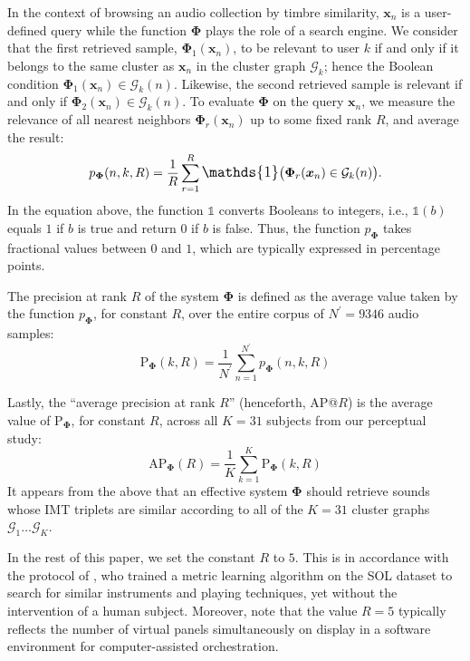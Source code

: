 \documentclass{bmcart}
\begin{document}
In the context of browsing an audio collection by timbre similarity, $\boldsymbol{x}_n$ is a user-defined query while the function $\mathbf{\Phi}$ plays the role of a search engine.
We consider that the first retrieved sample, $\mathbf{\Phi}_1 (\boldsymbol{x}_n)$, to be relevant to user $k$ if and only if it belongs to the same cluster as $\boldsymbol{x}_n$ in the cluster graph $\mathcal{G}_k$; hence the Boolean condition $\mathbf{\Phi}_{1}(\boldsymbol{x}_{n}) \in \mathcal{G}_k (n)$.
Likewise, the second retrieved sample is relevant if and only if $\mathbf{\Phi}_{2}(\boldsymbol{x}_{n}) \in \mathcal{G}_k (n)$.
To evaluate $\mathbf{\Phi}$ on the query $\boldsymbol{x}_n$, we measure the relevance of all nearest neighbors $\mathbf{\Phi}_r (\boldsymbol{x}_n)$ up to some fixed rank $R$, and average the result:
\begin{equation}
p_{\mathbf{\Phi}}(n, k, R) =
    \dfrac{1}{R}
    \sum_{r=1}^{R}
    \mathlarger{\mathds{1}}
    \big(
        \mathbf{\Phi}_r(\boldsymbol{x}_n)
        \in
        \mathcal{G}_k (n)
    \big).
\end{equation}
In the equation above, the function $\mathds{1}$ converts Booleans to integers, i.e., $\mathds{1}(b)$ equals $1$ if $b$ is true and return $0$ if $b$ is false.
Thus, the function $p_{\mathbf{\Phi}}$ takes fractional values between $0$ and $1$, which are typically expressed in percentage points.

The precision at rank $R$ of the system $\mathbf{\Phi}$ is defined as the average value taken by the function $p_{\mathbf{\Phi}}$, for constant $R$, over the entire corpus of $N^{\prime}=9346$ audio samples:
\begin{equation}
\mathrm{P}_{\mathbf{\Phi}}(k, R) =
\dfrac{1}{N^{\prime}}
\sum_{n=1}^{N^{\prime}}
p_{\mathbf{\Phi}}(n, k, R)
\end{equation}

Lastly, the ``average precision at rank $R$'' (henceforth, AP@$R$) is the average value of $\mathrm{P}_{\mathbf{\Phi}}$, for constant $R$, across all $K=31$ subjects from our perceptual study:
\begin{equation}
\mathrm{AP}_{\mathbf{\Phi}}(R) =
\dfrac{1}{K}
\sum_{k=1}^{K}
\mathrm{P}_{\mathbf{\Phi}}(k, R)
\end{equation}
It appears from the above that an effective system $\mathbf{\Phi}$ should retrieve sounds whose IMT triplets are similar according to all of the $K=31$ cluster graphs $\mathcal{G}_1 \ldots \mathcal{G}_K$.

In the rest of this paper, we set the constant $R$ to $5$.
This is in accordance with the protocol of \cite{lostanlen2018extended}, who trained a metric learning algorithm on the SOL dataset to search for similar instruments and playing techniques, yet without the intervention of a human subject.
Moreover, note that the value $R=5$ typically reflects the number of virtual panels simultaneously on display in a software environment for computer-assisted orchestration.
\end{document}
